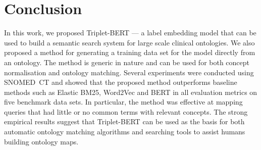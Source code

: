\documentclass[preprint,12pt]{elsarticle}
\begin{document}
\section*{Conclusion}
In this work, we proposed Triplet-BERT --- a label embedding model that can be used to build a semantic search system for large scale clinical ontologies. We also proposed a method for generating a training data set for the model directly from an ontology. The method is generic in nature and can be used for both concept normalisation and ontology matching. Several experiments were conducted using SNOMED~CT and showed that the proposed method outperforms baseline methods such as Elastic BM25, Word2Vec and BERT in all evaluation metrics on five benchmark data sets. In particular, the method was effective at mapping queries that had little or no common terms with relevant concepts. The strong empirical results suggest that Triplet-BERT can be used as the basis for both automatic ontology matching algorithms and searching tools to assist humans building ontology maps.
















\begin{thebibliography}{00}


\bibitem{}

\end{thebibliography}
\end{document}
